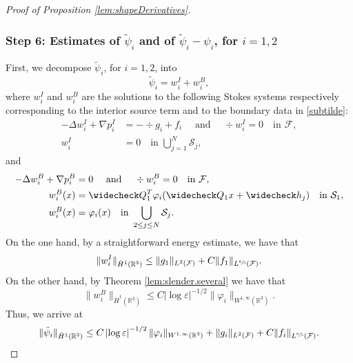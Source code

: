 \documentclass[10pt]{amsart}
\newcommand{\R}{\mathbb{R}}
\let\eps\varepsilon
\theoremstyle{definition}
\theoremstyle{remark}
\begin{document}
\begin{proof}[Proof of Proposition \ref{lem:shapeDerivatives}]
\subsubsection*{Step 6: Estimates of $\tilde \psi_i$ and of $\tilde \psi_i - \psi_i$, for $i=1,2$}
First, we decompose $\tilde \psi_i$, for $i=1,2$, into
\[
\tilde \psi_i = w_i^I + w_i^B,\] where $ w_i^I $ and $ w_i^B$ are the solutions to the following Stokes systems respectively corresponding to the interior source term and to the boundary data in \eqref{subtilde}:
\begin{align*}
- \Delta w_i^I + \nabla p_i^I &= -\div g_i + f_i \quad \text{ and } \quad \div w_i^I = 0 \quad \text{in } \mathcal F, \\
w_i^I &= 0 \quad \text{in } \bigcup_{j=1}^N \mathcal S_j,
\end{align*}
and
\begin{align*}
- \Delta w_i^{B} + \nabla p_i^{B} &= 0 \quad \text{ and } \quad \div w_i^{B} = 0 \quad \text{in } \mathcal F, \\
w_i^{B}(x) &= \widecheck Q_1^T \varphi_i(\widecheck Q_1 x + \widecheck h_j)\quad \text{in } \mathcal S_1, \\
w_i^{B}(x) &= \varphi_i(x) \quad \text{in } \bigcup_{2 \leq j \leq N} \mathcal S_j.
\end{align*}
On the one hand, by a straightforward energy estimate, we have that
\begin{equation*}
\| w^I_i \|_{\dot H^1(\R^3)} \leq \|g_1\|_{L^2 (\mathcal F)} + C \|f_1\|_{L^{\sfrac 6 5 }(\mathcal F)}.
\end{equation*}
On the other hand, by Theorem \ref{lem:slender.several}
we have that
\begin{equation*}
\| w_i^{B} \|_{\dot H^1 (\R^3)} \leq C \left|\log \eps\right|^{-1/2}\| \varphi_i\|_{W^{1,\infty}(\R^3)}.
\end{equation*}
Thus, we arrive at
\begin{equation}
\label{midi2}
\|\tilde \psi_i\|_{\dot H^1(\R^3)} \leq C \left|\log \eps\right|^{-1/2}\| \varphi_i\|_{W^{1,\infty} (\R^3)} + \| g_i\|_{L^2(\mathcal F)} + C \|f_i\|_{L^{\sfrac 6 5 }(\mathcal F)}.
\end{equation}


\end{proof}
\end{document}
